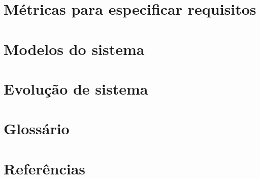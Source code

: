 \documentclass[letter]{article}
\begin{document}
\section{Métricas para especificar requisitos}
\section{Modelos do sistema}
\section{Evolução de sistema}
\section{Glossário}
\section{Referências}
\end{document}
